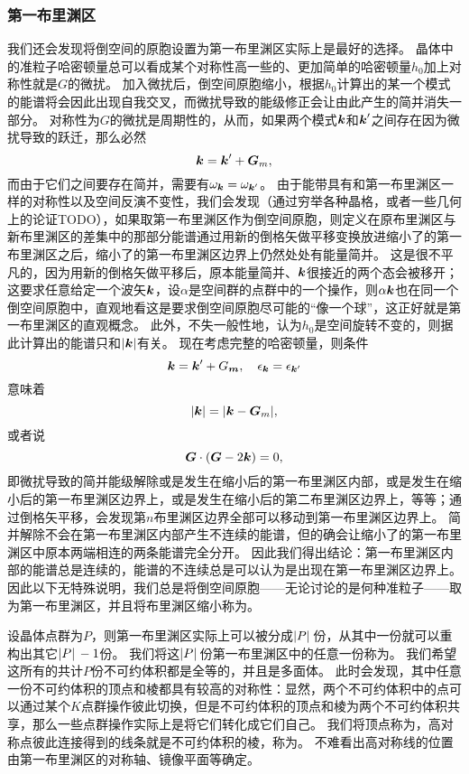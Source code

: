 \subsubsection{第一布里渊区} 

我们还会发现将倒空间的原胞设置为第一布里渊区实际上是最好的选择。
晶体中的准粒子哈密顿量总可以看成某个对称性高一些的、更加简单的哈密顿量$h_0$加上对称性就是$G$的微扰。
加入微扰后，倒空间原胞缩小，根据$h_0$计算出的某一个模式的能谱将会因此出现自我交叉，而微扰导致的能级修正会让由此产生的简并消失一部分。
对称性为$G$的微扰是周期性的，从而，如果两个模式$\vb*{k}$和$\vb*{k}'$之间存在因为微扰导致的跃迁，那么必然
\[
    \vb*{k} = \vb*{k}' + \vb*{G}_m,
\]
而由于它们之间要存在简并，需要有$\omega_{\vb*{k}} = \omega_{\vb*{k}'}$。
由于能带具有和第一布里渊区一样的对称性以及空间反演不变性，我们会发现（通过穷举各种晶格，或者一些几何上的论证TODO），如果取第一布里渊区作为倒空间原胞，则定义在原布里渊区与新布里渊区的差集中的那部分能谱通过用新的倒格矢做平移变换放进缩小了的第一布里渊区之后，缩小了的第一布里渊区边界上仍然处处有能量简并。
这是很不平凡的，因为用新的倒格矢做平移后，原本能量简并、$\vb*{k}$很接近的两个态会被移开；这要求任意给定一个波矢$\vb*{k}$，设$\alpha$是空间群的点群中的一个操作，则$\alpha \vb*{k}$也在同一个倒空间原胞中，直观地看这是要求倒空间原胞尽可能的“像一个球”，这正好就是第一布里渊区的直观概念。
此外，不失一般性地，认为$h_0$是空间旋转不变的，则据此计算出的能谱只和$\abs{\vb*{k}}$有关。
现在考虑完整的哈密顿量，则条件
\[
    \vb*{k} = \vb*{k}' + G_{\vb*{m}}, \quad \epsilon_{\vb*{k}} = \epsilon_{\vb*{k}'}
\]
意味着
\[
    \abs{\vb*{k}} = \abs{\vb*{k} - \vb*{G}_m},
\]
或者说
\[
    \vb*{G} \cdot (\vb*{G} - 2 \vb*{k}) = 0,
\]
即微扰导致的简并能级解除或是发生在缩小后的第一布里渊区内部，或是发生在缩小后的第一布里渊区边界上，或是发生在缩小后的第二布里渊区边界上，等等；通过倒格矢平移，会发现第$n$布里渊区边界全部可以移动到第一布里渊区边界上。
简并解除不会在第一布里渊区内部产生不连续的能谱，但的确会让缩小了的第一布里渊区中原本两端相连的两条能谱完全分开。
因此我们得出结论：第一布里渊区内部的能谱总是连续的，能谱的不连续总是可以认为是出现在第一布里渊区边界上。
因此以下无特殊说明，我们总是将倒空间原胞——无论讨论的是何种准粒子——取为第一布里渊区，并且将布里渊区缩小称为。

设晶体点群为$P$，则第一布里渊区实际上可以被分成$\abs*{P}$份，从其中一份就可以重构出其它$\abs*{P} - 1$份。
我们将这$\abs*{P}$份第一布里渊区中的任意一份称为。
我们希望这所有的共计$P$份不可约体积都是全等的，并且是多面体。
此时会发现，其中任意一份不可约体积的顶点和棱都具有较高的对称性：显然，两个不可约体积中的点可以通过某个$K$点群操作彼此切换，但是不可约体积的顶点和棱为两个不可约体积共享，那么一些点群操作实际上是将它们转化成它们自己。
我们将顶点称为，高对称点彼此连接得到的线条就是不可约体积的棱，称为。
不难看出高对称线的位置由第一布里渊区的对称轴、镜像平面等确定。

